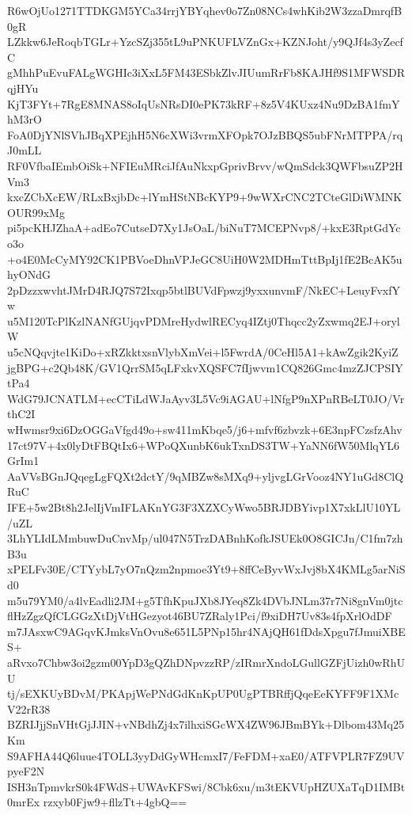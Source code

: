 R6wOjUo1271TTDKGM5YCa34rrjYBYqhev0o7Zn08NCs4whKib2W3zzaDmrqfB0gR
LZkkw6JeRoqbTGLr+YzcSZj355tL9uPNKUFLVZnGx+KZNJoht/y9QJf4s3yZecfC
gMhhPuEvuFALgWGHIc3iXxL5FM43ESbkZlvJIUumRrFb8KAJHf9S1MFWSDRqjHYu
KjT3FYt+7RgE8MNAS8oIqUsNRsDI0ePK73kRF+8z5V4KUxz4Nu9DzBA1fmYhM3rO
FoA0DjYNlSVhJBqXPEjhH5N6cXWi3vrmXFOpk7OJzBBQS5ubFNrMTPPA/rqJ0mLL
RF0VfbaIEmbOiSk+NFIEuMRciJfAuNkxpGprivBrvv/wQmSdck3QWFbsuZP2HVm3
kxcZCbXcEW/RLxBxjbDc+lYmHStNBcKYP9+9wWXrCNC2TCteGlDiWMNKOUR99xMg
pi5pcKHJZhaA+adEo7CutseD7Xy1JsOaL/biNuT7MCEPNvp8/+kxE3RptGdYco3o
+o4E0McCyMY92CK1PBVoeDhnVPJeGC8UiH0W2MDHmTttBpIj1fE2BcAK5uhyONdG
2pDzzxwvhtJMrD4RJQ7S72Ixqp5btlBUVdFpwzj9yxxunvmF/NkEC+LeuyFvxfYw
u5M120TcPlKzlNANfGUjqvPDMreHydwlRECyq4IZtj0Thqcc2yZxwmq2EJ+orylW
u5cNQqvjte1KiDo+xRZkktxsnVlybXmVei+l5FwrdA/0CeHl5A1+kAwZgik2KyiZ
jgBPG+c2Qb48K/GV1QrrSM5qLFxkvXQSFC7fIjwvm1CQ826Gmc4mzZJCPSIYtPa4
WdG79JCNATLM+ecCTiLdWJaAyv3L5Vc9iAGAU+lNfgP9nXPnRBeLT0JO/VrthC2I
wHwmsr9xi6DzOGGaVfgd49o+sw411mKbqe5/j6+mfvf6zbvzk+6E3npFCzsfzAhv
17ct97V+4x0lyDtFBQtIx6+WPoQXunbK6ukTxnDS3TW+YaNN6fW50MlqYL6GrIm1
AaVVsBGnJQqegLgFQXt2dctY/9qMBZw8sMXq9+yljvgLGrVooz4NY1uGd8ClQRuC
IFE+5w2Bt8h2JelIjVmIFLAKnYG3F3XZXCyWwo5BRJDBYivp1X7xkLlU10YL/uZL
3LhYLIdLMmbuwDuCnvMp/ul047N5TrzDABnhKofkJSUEk0O8GICJn/C1fm7zhB3u
xPELFv30E/CTYybL7yO7nQzm2npmoe3Yt9+8ffCeByvWxJvj8bX4KMLg5arNiSd0
m5u79YM0/a4lvEadli2JM+g5TfhKpuJXb8JYeq8Zk4DVbJNLm37r7Ni8gnVm0jtc
flHzZgzQfCLGGzXtDjVtHGezyot46BU7ZRaly1Pci/f9xiDH7Uv83s4fpXrlOdDF
m7JAsxwC9AGqvKJmksVnOvu8e651L5PNp15hr4NAjQH61fDdsXpgu7fJmuiXBES+
aRvxo7Chbw3oi2gzm00YpD3gQZhDNpvzzRP/zIRmrXndoLGullGZFjUizh0wRhUU
tj/sEXKUyBDvM/PKApjWePNdGdKnKpUP0UgPTBRffjQqeEeKYFF9F1XMcV22rR38
BZRIJjjSnVHtGjJJIN+vNBdhZj4x7ilhxiSGcWX4ZW96JBmBYk+Dlbom43Mq25Km
S9AFHA44Q6luue4TOLL3yyDdGyWHcmxI7/FeFDM+xaE0/ATFVPLR7FZ9UVpyeF2N
ISH3nTpmvkrS0k4FWdS+UWAvKFSwi/8Cbk6xu/m3tEKVUpHZUXaTqD1IMBt0mrEx
rzxyb0Fjw9+fllzTt+4gbQ==
